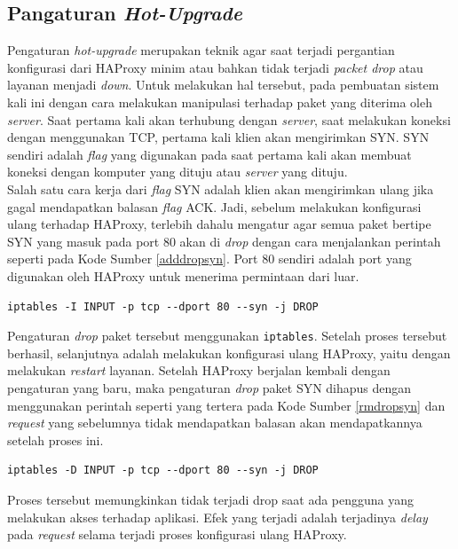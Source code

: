         \subsection{Pangaturan \textit{Hot-Upgrade}}
        	Pengaturan \textit{hot-upgrade} merupakan teknik agar saat terjadi pergantian konfigurasi dari HAProxy minim atau bahkan tidak terjadi \textit{packet drop} atau layanan menjadi \textit{down}. Untuk melakukan hal tersebut, pada pembuatan sistem kali ini dengan cara melakukan manipulasi terhadap paket yang diterima oleh \textit{server}. Saat pertama kali akan terhubung dengan \textit{server}, saat melakukan koneksi dengan menggunakan TCP, pertama kali klien akan mengirimkan SYN. SYN sendiri adalah \textit{flag} yang digunakan pada saat pertama kali akan membuat koneksi dengan komputer yang dituju atau \textit{server} yang dituju.\\
            \indent Salah satu cara kerja dari \textit{flag} SYN adalah klien akan mengirimkan ulang jika gagal mendapatkan balasan \textit{flag} ACK. Jadi, sebelum melakukan konfigurasi ulang terhadap HAProxy, terlebih dahalu mengatur agar semua paket bertipe SYN yang masuk pada port 80 akan di \textit{drop} dengan cara menjalankan perintah seperti pada Kode Sumber \ref{adddropsyn}. Port 80 sendiri adalah port yang digunakan oleh HAProxy untuk menerima permintaan dari luar.
            \begin{lstlisting}[frame=single,tabsize=2,breaklines,caption={Menambahkan Rule Input pada \texttt{iptables}},label=adddropsyn, captionpos=b]
iptables -I INPUT -p tcp --dport 80 --syn -j DROP
			\end{lstlisting}
            \indent Pengaturan \textit{drop} paket tersebut menggunakan \texttt{iptables}. Setelah proses tersebut berhasil, selanjutnya adalah melakukan konfigurasi ulang HAProxy, yaitu dengan melakukan \textit{restart} layanan. Setelah HAProxy berjalan kembali dengan pengaturan yang baru, maka pengaturan \textit{drop} paket SYN dihapus dengan menggunakan perintah seperti yang tertera pada Kode Sumber \ref{rmdropsyn} dan \textit{request} yang sebelumnya tidak mendapatkan balasan akan mendapatkannya setelah proses ini.\\
            \begin{lstlisting}[frame=single,tabsize=2,breaklines,caption={Menghapus Rule Input pada \texttt{iptables}},label=rmdropsyn, captionpos=b]
iptables -D INPUT -p tcp --dport 80 --syn -j DROP
			\end{lstlisting}
            \indent Proses tersebut memungkinkan tidak terjadi drop saat ada pengguna yang melakukan akses terhadap aplikasi. Efek yang terjadi adalah terjadinya \textit{delay} pada \textit{request} selama terjadi proses konfigurasi ulang HAProxy.
             
